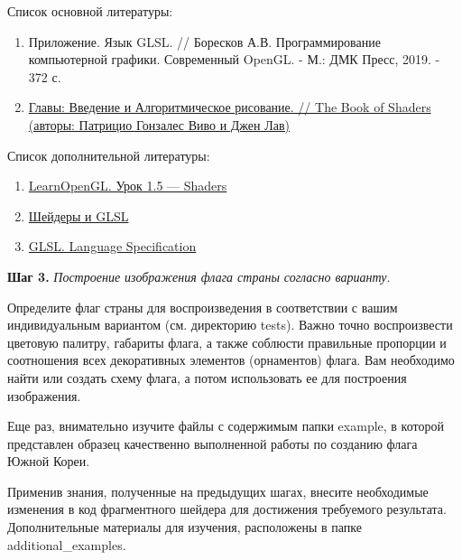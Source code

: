 \documentclass[a4paper,12pt]{article}
\theoremstyle{plain}
\begin{document}
    
    
    Список основной литературы:
    \begin{enumerate}
    \item 
    Приложение. Язык GLSL. // Боресков А.В. Программирование компьютерной графики. Современный OpenGL. - М.: ДМК Пресс, 2019. - 372 с.
    \item 
    \href{https://thebookofshaders.com/?lan=ru}{Главы: Введение и Алгоритмическое рисование. // The Book of Shaders (авторы: Патрицио Гонзалес Виво и Джен Лав)} 
    
    \end{enumerate}
    
    
    Список дополнительной литературы:
    \begin{enumerate}
    
    \item 
    \href{https://habr.com/ru/post/313380/
    }{LearnOpenGL. Урок 1.5 — Shaders}
    
    \item \href{https://webglfundamentals.org/webgl/lessons/ru/webgl-shaders-and-glsl.html}{Шейдеры и GLSL}
    
    \item 
    \href{https://www.khronos.org/registry/OpenGL/specs/gl/}{GLSL. Language Specification}
    
\end{enumerate}
    
    \textbf{Шаг 3.} \textit{Построение изображения флага страны согласно варианту.}
    
    Определите флаг страны для воспроизведения в соответствии с вашим индивидуальным вариантом (см. директорию tests). Важно точно воспроизвести цветовую палитру, габариты флага, а также соблюсти правильные пропорции и соотношения всех декоративных элементов (орнаментов) флага. Вам необходимо найти или создать схему флага, а потом использовать ее для построения изображения.
    
    Еще раз, внимательно изучите файлы с содержимым папки 
    \textquotedbl example\textquotedbl, 
    в которой представлен образец качественно выполненной работы по созданию флага Южной Кореи.
    
    Применив знания, полученные на предыдущих шагах, внесите необходимые изменения в код фрагментного шейдера для достижения требуемого результата.
    Дополнительные материалы для изучения, расположены в папке 
    \textquotedbl additional\_examples\textquotedbl.
\end{document}
